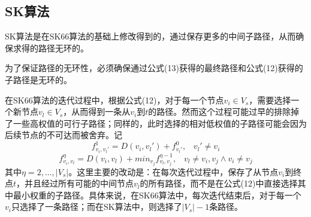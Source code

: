 \documentclass[UTF8]{ctexart}
\begin{document}
\subsection{SK算法}
\par SK算法是在SK66算法的基础上修改得到的，通过保存更多的中间子路径，从而确保求得的路径无环的。
\par 为了保证路径的无环性，必须确保通过公式(13)获得的最终路径和公式(12)获得的子路径是无环的。
\par 在SK66算法的迭代过程中，根据公式(12)，对于每一个节点$v_{i} \in V_{s}$，需要选择一个新节点$v_{l} \in V_{s}$，从而得到一条从$v_{i}$到$t$的路径。然而这个过程可能过早的排除掉了一些高权值的可行子路径；同样的，此时选择的相对低权值的子路径可能会因为后续节点的不可达而被舍弃。记
\begin{equation}
f_{v_{i},v_{l}'}^{1} = D(v_{i},v_{l}')+f_{v_{l}'}^{0},\; \; \; v_{l}'\neq v_{i}
\end{equation}
\begin{equation}
f_{v_{i},v_{l}}^{\eta} = D(v_{i},v_{l})+min_{v_{j}}f_{v_{l},v_{j}}^{\eta -1},\; \; \; v_{l}\neq v_{i},v_{j}\wedge v_{i}\neq v_{j}
\end{equation}
其中$\eta = 2,\dots,|V_{s}|$。这里主要的改动是：在每次迭代过程中，保存了从节点$v_{i}$到终点$t$，并且经过所有可能的中间节点$v_{l}$的所有路径，而不是在公式(12)中直接选择其中最小权重的子路径。具体来说，在SK66算法中，每次迭代结束后，对于每一个$v_{i}$只选择了一条路径；而在SK算法中，则选择了$|V_{s}| -1$条路径。
\end{document}
